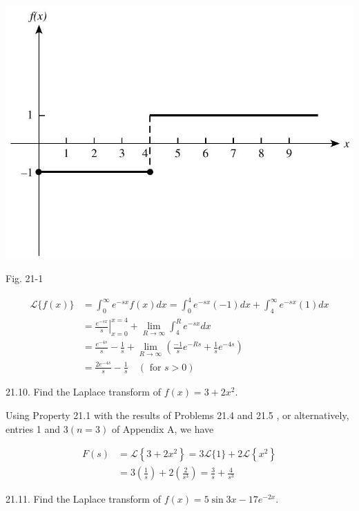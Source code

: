 \documentclass[10pt]{article}
\begin{document}
\begin{center}
\includegraphics[max width=\textwidth]{2024_04_03_5bb5b4275a64cb9887d1g-232}
\end{center}

Fig. 21-1

$$
\begin{aligned}
\mathscr{L}\{f(x)\} & =\int_{0}^{\infty} e^{-s x} f(x) d x=\int_{0}^{4} e^{-s x}(-1) d x+\int_{4}^{\infty} e^{-s x}(1) d x \\
& =\left.\frac{e^{-s x}}{s}\right|_{x=0} ^{x=4}+\lim _{R \rightarrow \infty} \int_{4}^{R} e^{-s x} d x \\
& =\frac{e^{-4 s}}{s}-\frac{1}{s}+\lim _{R \rightarrow \infty}\left(\frac{-1}{s} e^{-R s}+\frac{1}{s} e^{-4 s}\right) \\
& =\frac{2 e^{-4 s}}{s}-\frac{1}{s} \quad(\text { for } s>0)
\end{aligned}
$$

21.10. Find the Laplace transform of $f(x)=3+2 x^{2}$.

Using Property 21.1 with the results of Problems 21.4 and 21.5 , or alternatively, entries 1 and $3(n=3)$ of Appendix A, we have

$$
\begin{aligned}
F(s) & =\mathscr{L}\left\{3+2 x^{2}\right\}=3 \mathscr{L}\{1\}+2 \mathscr{L}\left\{x^{2}\right\} \\
& =3\left(\frac{1}{s}\right)+2\left(\frac{2}{s^{3}}\right)=\frac{3}{s}+\frac{4}{s^{3}}
\end{aligned}
$$

21.11. Find the Laplace transform of $f(x)=5 \sin 3 x-17 e^{-2 x}$.
\end{document}
